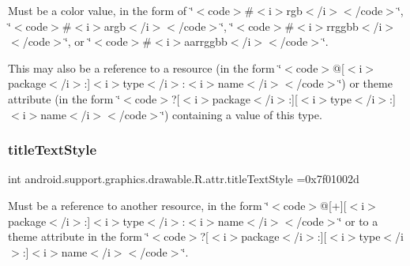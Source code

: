 Must be a color value, in the form of \char`\"{}$<$code$>$\#$<$i$>$rgb$<$/i$>$$<$/code$>$\char`\"{}, \char`\"{}$<$code$>$\#$<$i$>$argb$<$/i$>$$<$/code$>$\char`\"{}, \char`\"{}$<$code$>$\#$<$i$>$rrggbb$<$/i$>$$<$/code$>$\char`\"{}, or \char`\"{}$<$code$>$\#$<$i$>$aarrggbb$<$/i$>$$<$/code$>$\char`\"{}. 

This may also be a reference to a resource (in the form \char`\"{}$<$code$>$@\mbox{[}$<$i$>$package$<$/i$>$\+:\mbox{]}$<$i$>$type$<$/i$>$\+:$<$i$>$name$<$/i$>$$<$/code$>$\char`\"{}) or theme attribute (in the form \char`\"{}$<$code$>$?\mbox{[}$<$i$>$package$<$/i$>$\+:\mbox{]}\mbox{[}$<$i$>$type$<$/i$>$\+:\mbox{]}$<$i$>$name$<$/i$>$$<$/code$>$\char`\"{}) containing a value of this type. \mbox{\label{classandroid_1_1support_1_1graphics_1_1drawable_1_1R_1_1attr_aa7a51408e6331ea887097c76e7e58cc6}} 
\subsubsection{\texorpdfstring{title\+Text\+Style}{titleTextStyle}}
{\footnotesize\ttfamily int android.\+support.\+graphics.\+drawable.\+R.\+attr.\+title\+Text\+Style =0x7f01002d\hspace{0.3cm}{\ttfamily [static]}}

Must be a reference to another resource, in the form \char`\"{}$<$code$>$@\mbox{[}+\mbox{]}\mbox{[}$<$i$>$package$<$/i$>$\+:\mbox{]}$<$i$>$type$<$/i$>$\+:$<$i$>$name$<$/i$>$$<$/code$>$\char`\"{} or to a theme attribute in the form \char`\"{}$<$code$>$?\mbox{[}$<$i$>$package$<$/i$>$\+:\mbox{]}\mbox{[}$<$i$>$type$<$/i$>$\+:\mbox{]}$<$i$>$name$<$/i$>$$<$/code$>$\char`\"{}. \mbox{\label{classandroid_1_1support_1_1graphics_1_1drawable_1_1R_1_1attr_a221aa0a0308eaf9db8943a2c35728091}} 
